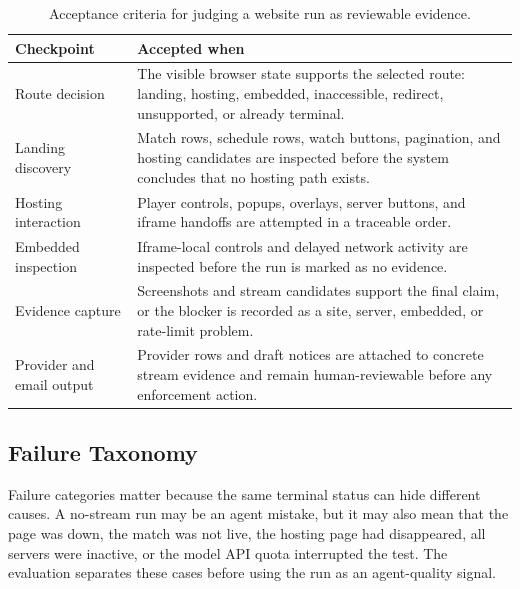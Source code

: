 \begin{table}[!htbp]
\centering
\begin{tabularx}{\textwidth}{Q{3.6cm}Y}
\toprule
{}
Checkpoint & Accepted when \\
\midrule
Route decision & The visible browser state supports the selected route: landing,
hosting, embedded, inaccessible, redirect, unsupported, or already terminal. \\
Landing discovery & Match rows, schedule rows, watch buttons, pagination, and hosting
candidates are inspected before the system concludes that no hosting path exists. \\
Hosting interaction & Player controls, popups, overlays, server buttons, and iframe
handoffs are attempted in a traceable order. \\
Embedded inspection & Iframe-local controls and delayed network activity are inspected
before the run is marked as no evidence. \\
Evidence capture & Screenshots and stream candidates support the final claim, or the
blocker is recorded as a site, server, embedded, or rate-limit problem. \\
Provider and email output & Provider rows and draft notices are attached to concrete
stream evidence and remain human-reviewable before any enforcement action. \\
\bottomrule
\end{tabularx}
\caption{Acceptance criteria for judging a website run as reviewable evidence.}
\label{tab:eval-acceptance-criteria}
\end{table}

\subsection{Failure Taxonomy}

Failure categories matter because the same terminal status can hide different causes.
A no-stream run may be an agent mistake, but it may also mean that the page was down,
the match was not live, the hosting page had disappeared, all servers were inactive, or
the model API quota interrupted the test. The evaluation separates these cases before
using the run as an agent-quality signal.

